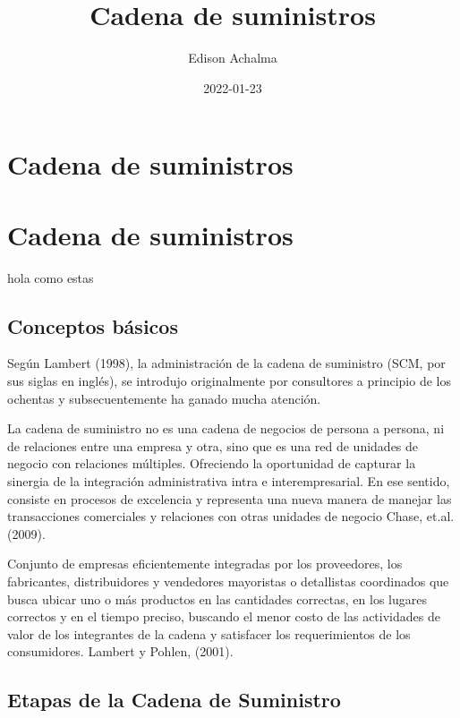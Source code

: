 \documentclass[
  jou,
  floatsintext,
  longtable,
  a4paper,
  nolmodern,
  notxfonts,
  notimes,
  colorlinks=true,linkcolor=blue,citecolor=blue,urlcolor=blue]{apa7}
\title{Cadena de suministros}
\author{Edison Achalma}
\affiliation{
{Departamento de Economía, Universidad Nacional de San Cristóbal de
Huamanga}}
\date{2022-01-23}
\begin{document}
\maketitle

\hypertarget{toc}{}
\tableofcontents
\newpage
\section[Introduction]{Cadena de suministros}

\setcounter{secnumdepth}{-\maxdimen} %

\setlength\LTleft{0pt}


\section{Cadena de suministros}\label{cadena-de-suministros}

hola como estas

\subsection{Conceptos básicos}\label{conceptos-buxe1sicos}

Según Lambert (1998), la administración de la cadena de suministro (SCM,
por sus siglas en inglés), se introdujo originalmente por consultores a
principio de los ochentas y subsecuentemente ha ganado mucha atención.

La cadena de suministro no es una cadena de negocios de persona a
persona, ni de relaciones entre una empresa y otra, sino que es una red
de unidades de negocio con relaciones múltiples. Ofreciendo la
oportunidad de capturar la sinergia de la integración administrativa
intra e interempresarial. En ese sentido, consiste en procesos de
excelencia y representa una nueva manera de manejar las transacciones
comerciales y relaciones con otras unidades de negocio Chase, et.al.
(2009).

Conjunto de empresas eficientemente integradas por los proveedores, los
fabricantes, distribuidores y vendedores mayoristas o detallistas
coordinados que busca ubicar uno o más productos en las cantidades
correctas, en los lugares correctos y en el tiempo preciso, buscando el
menor costo de las actividades de valor de los integrantes de la cadena
y satisfacer los requerimientos de los consumidores. Lambert y Pohlen,
(2001).

\subsection{Etapas de la Cadena de
Suministro}\label{etapas-de-la-cadena-de-suministro}
\end{document}
